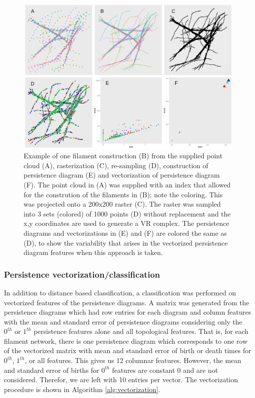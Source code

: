 \documentclass[10pt]{article}
\begin{document}
\begin{figure}[tbp]
	\begin{center}
		\includegraphics[width=1\textwidth]{figures/resample_algo.png}
	\end{center}
	\caption{Example of one filament construction (B) from the supplied point cloud (A), rasterization (C), re-sampling (D), construction of persistence diagram (E) and vectorization of persistence diagram (F). The point cloud in (A) was supplied with an index that allowed for the constrution of the filaments in (B); note the coloring. This was projected onto a 200x200 raster (C). The raster was sampled into 3 sets (colored) of 1000 points (D) without replacement and the x,y coordinates are used to generate a VR complex. The persistence diagrams and vectorizations in (E) and (F) are colored the same as (D), to show the variability that arises in the vectorized persistence diagram features when this approach is taken.}
	\label{fig:resample_algorithm}
\end{figure}


\subsubsection{Persistence vectorization/classification}

In addition to distance based classification, a classification was performed on vectorized features of the persistence diagrams. A matrix was generated from the persistence diagrams which had row entries for each diagram and column features with the mean and standard error of persistence diagrams considering only the $0^{th}$ or $1^{th}$ persistence features alone and all topological features. That is, for each filament network, there is one persistence diagram which corresponds to one row of the vectorized matrix with mean and standard error of birth or death times for $0^{th}$, $1^{th}$, or all features. This gives us 12 columnar features. However, the mean and standard error of births for $0^{th}$ features are constant 0 and are not considered. Therefor, we are left with 10 entries per vector. The vectorization procedure is shown in Algorithm \ref{alg:vectorization}. 
\end{document}
